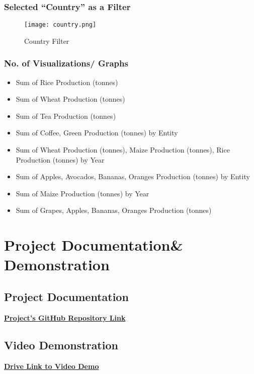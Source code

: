 \documentclass{article}
\begin{document}
\subsubsection{Selected “Country” as a Filter}
\begin{figure}[H]
    \centering
    \texttt{[image: country.png]}
    \caption{Country Filter}
    \label{fig:country}
  \end{figure}
\subsubsection{No. of Visualizations/ Graphs}
\begin{itemize}
    \item Sum of Rice Production (tonnes)
    \item Sum of Wheat Production (tonnes)
    \item Sum of Tea Production (tonnes) 
    \item Sum of Coffee, Green Production (tonnes) by Entity
    \item Sum of Wheat Production (tonnes), Maize Production (tonnes), Rice Production (tonnes) by Year
    \item Sum of Apples, Avocados, Bananas, Oranges Production (tonnes) by Entity
    \item Sum of Maize Production (tonnes) by Year
    \item Sum of Grapes, Apples, Bananas, Oranges Production (tonnes)
\end{itemize}

\section{Project Documentation\& Demonstration}
\subsection{Project Documentation}
\textbf{\href{https://github.com/rohitprofc/global-food-production-trends-and-analysis}{Project's GitHub Repository Link}}
\subsection{Video Demonstration}
\textbf{\href{https://drive.google.com/drive/folders/1S8NCwMFRkYbBeIlY_46ocJlg5gv-J5vx?usp=sharing}{Drive Link to Video Demo}}
\end{document}
